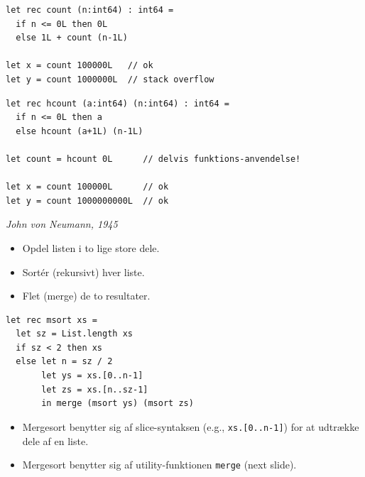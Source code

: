 \documentclass[rgb]{beamer}
\begin{document}
\begin{frame}[fragile]
\begin{footnotesize}


\begin{lstlisting}[numbers=none,frame=none,mathescape]
let rec count (n:int64) : int64 =
  if n <= 0L then 0L
  else 1L + count (n-1L)

let x = count 100000L   // ok
let y = count 1000000L  // stack overflow
\end{lstlisting}

\vspace{2mm}

\begin{lstlisting}[numbers=none,frame=none,mathescape]
let rec hcount (a:int64) (n:int64) : int64 =
  if n <= 0L then a
  else hcount (a+1L) (n-1L)

let count = hcount 0L      // delvis funktions-anvendelse!

let x = count 100000L      // ok
let y = count 1000000000L  // ok
\end{lstlisting}

\end{footnotesize}
\end{frame}

\begin{frame}[fragile]
\begin{footnotesize}


  \emph{John von Neumann, 1945}

  \begin{itemize}
  \item Opdel listen i to lige store dele.
  \item Sort\'er (rekursivt) hver liste.
  \item Flet (merge) de to resultater.
  \end{itemize}


\begin{lstlisting}[numbers=none,frame=none,mathescape]
let rec msort xs =
  let sz = List.length xs
  if sz < 2 then xs
  else let n = sz / 2
       let ys = xs.[0..n-1]
       let zs = xs.[n..sz-1]
       in merge (msort ys) (msort zs)
\end{lstlisting}

\begin{itemize}
\item Mergesort benytter sig af slice-syntaksen (e.g., \lstinline{xs.[0..n-1]}) for at udtrække dele af en liste.
\item Mergesort benytter sig af utility-funktionen \lstinline{merge} (next slide).
\end{itemize}
\end{footnotesize}
\end{frame}
\end{document}
